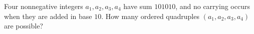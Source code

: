 Four nonnegative integers $a_1,a_2,a_3,a_4$ have sum $101010$, and no carrying occurs when they are added in base $10$. How many ordered quadruples $(a_1,a_2,a_3,a_4)$ are possible?
